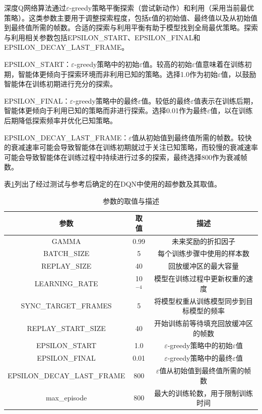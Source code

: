 深度Q网络算法通过$\varepsilon$-greedy策略平衡探索（尝试新动作）和利用（采用当前最优策略）。这类参数主要用于调整探索程度，包括ε值的初始值、最终值以及从初始值到最终值所需的帧数。合适的探索与利用平衡有助于模型找到全局最优策略。探索与利用相关参数包括EPSILON\_START、EPSILON\_FINAL和EPSILON\_DECAY\_LAST\_FRAME。

EPSILON\_START：$\varepsilon$-greedy策略中的初始$\varepsilon$值。较高的初始$\varepsilon$值意味着在训练初期，智能体更倾向于探索环境而非利用已知的策略。选择1.0作为初始$\varepsilon$值，以鼓励智能体在训练初期进行充分的探索。

EPSILON\_FINAL：$\varepsilon$-greedy策略中的最终$\varepsilon$值。较低的最终$\varepsilon$值表示在训练后期，智能体更倾向于利用已知的策略而非进行探索。选择0.01作为最终$\varepsilon$值，以在训练后期降低探索频率并优化已知策略。

EPSILON\_DECAY\_LAST\_FRAME：$\varepsilon$值从初始值到最终值所需的帧数。较快的衰减速率可能会导致智能体在训练初期就过于关注已知策略，而较慢的衰减速率可能会导致智能体在训练过程中持续进行过多的探索，最终选择800作为衰减帧数。

表\ref{demand_inf}列出了经过测试与参考后确定的在DQN中使用的超参数及其取值。
\renewcommand{\arraystretch}{1.2} %
\begin{table}[htbp]
\centering
\caption{参数的取值与描述}
\label{demand_inf}
\begin{tabular}{ccc}
\toprule
参数 & 取值 & 描述       \\
\midrule
GAMMA & 0.99 & 未来奖励的折扣因子 \\ 
BATCH\_SIZE & 5 & 每个训练步骤中使用的样本数 \\ 
REPLAY\_SIZE & 40 & 回放缓冲区的最大容量 \\ 
LEARNING\_RATE & 10$^{-4}$ & 模型在训练过程中更新权重的速度 \\ 
SYNC\_TARGET\_FRAMES & 5 & 将模型权重从训练模型同步到目标模型的频率 \\ 
REPLAY\_START\_SIZE & 40 & 开始训练前等待填充回放缓冲区的帧数 \\ 
EPSILON\_START & 1.0 & $\varepsilon$-greedy策略中的初始$\varepsilon$值 \\ 
EPSILON\_FINAL & 0.01 & $\varepsilon$-greedy策略中的最终$\varepsilon$值 \\ 
EPSILON\_DECAY\_LAST\_FRAME & 800 & $\varepsilon$值从初始值到最终值所需的帧数 \\ 
max\_episode & 800 & 最大的训练轮数，用于限制训练时间 \\ 

\bottomrule
\end{tabular}
\end{table}



